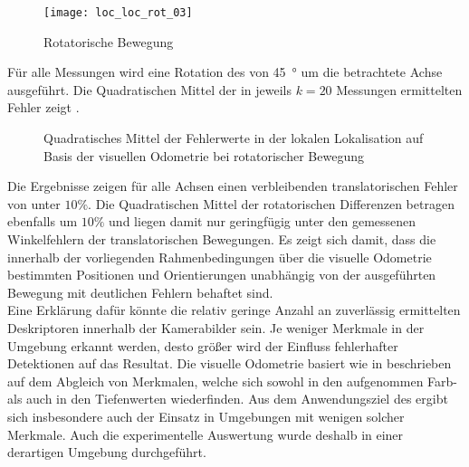 \prever{
}

\begin{figure}[!ht]
	\begin{center}
		\texttt{[image: loc\_loc\_rot\_03]}
		\caption{Rotatorische Bewegung}
		\label{fig.rotmove}
	\end{center}
\end{figure}

\prever{
}
Für alle Messungen wird eine Rotation des  von \SI{45}{°} um die betrachtete Achse ausgeführt. Die Quadratischen Mittel der in jeweils $k=20$ Messungen ermittelten Fehler zeigt .\\

\begin{figure}

\caption{Quadratisches Mittel der Fehlerwerte in der lokalen Lokalisation auf Basis der visuellen Odometrie bei rotatorischer Bewegung}
\label{fig.loc_loc_rot_fovis}
\end{figure}


Die Ergebnisse zeigen für alle Achsen einen verbleibenden translatorischen Fehler von unter $10\%$. Die Quadratischen Mittel der rotatorischen Differenzen betragen ebenfalls um $10\%$ und liegen damit nur geringfügig unter den gemessenen Winkelfehlern der translatorischen Bewegungen. Es zeigt sich damit, dass die innerhalb der vorliegenden Rahmenbedingungen über die visuelle Odometrie bestimmten Positionen und Orientierungen unabhängig von der ausgeführten Bewegung mit deutlichen Fehlern behaftet sind.\\

Eine Erklärung dafür könnte die relativ geringe Anzahl an zuverlässig ermittelten Deskriptoren innerhalb der Kamerabilder sein. Je weniger Merkmale in der Umgebung erkannt werden, desto größer wird der Einfluss fehlerhafter Detektionen auf das Resultat. Die visuelle Odometrie basiert wie in  beschrieben auf dem Abgleich von Merkmalen, welche sich sowohl in den aufgenommen Farb- als auch in den Tiefenwerten wiederfinden. Aus dem Anwendungsziel des  ergibt sich insbesondere auch der Einsatz in Umgebungen mit wenigen solcher Merkmale. Auch die experimentelle Auswertung wurde deshalb in einer derartigen Umgebung durchgeführt.\\

